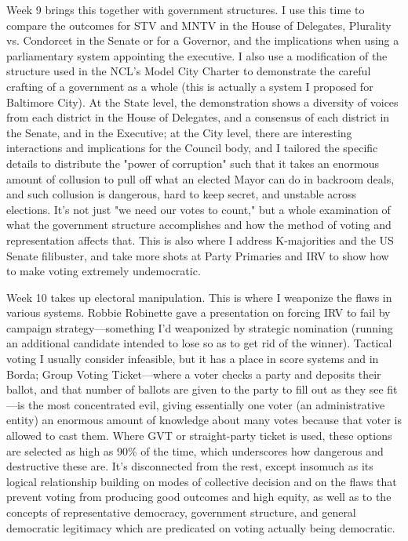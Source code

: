 Week 9 brings this together with government structures.  I use this time to compare the outcomes for STV and MNTV in the House of Delegates, Plurality vs. Condorcet in the Senate or for a Governor, and the implications when using a parliamentary system appointing the executive.  I also use a modification of the structure used in the NCL's Model City Charter to demonstrate the careful crafting of a government as a whole (this is actually a system I proposed for Baltimore City).  At the State level, the demonstration shows a diversity of voices from each district in the House of Delegates, and a consensus of each district in the Senate, and in the Executive; at the City level, there are interesting interactions and implications for the Council body, and I tailored the specific details to distribute the "power of corruption" such that it takes an enormous amount of collusion to pull off what an elected Mayor can do in backroom deals, and such collusion is dangerous, hard to keep secret, and unstable across elections.  It's not just "we need our votes to count," but a whole examination of what the government structure accomplishes and how the method of voting and representation affects that.  This is also where I address K-majorities and the US Senate filibuster, and take more shots at Party Primaries and IRV to show how to make voting extremely undemocratic.

Week 10 takes up electoral manipulation.  This is where I weaponize the flaws in various systems.  Robbie Robinette gave a presentation on forcing IRV to fail by campaign strategy—something I'd weaponized by strategic nomination (running an additional candidate intended to lose so as to get rid of the winner).  Tactical voting I usually consider infeasible, but it has a place in score systems and in Borda; Group Voting Ticket—where a voter checks a party and deposits their ballot, and that number of ballots are given to the party to fill out as they see fit—is the most concentrated evil, giving essentially one voter (an administrative entity) an enormous amount of knowledge about many votes because that voter is allowed to cast them.  Where GVT or straight-party ticket is used, these options are selected as high as 90\% of the time, which underscores how dangerous and destructive these are.  It's disconnected from the rest, except insomuch as its logical relationship building on modes of collective decision and on the flaws that prevent voting from producing good outcomes and high equity, as well as to the concepts of representative democracy, government structure, and general democratic legitimacy which are predicated on voting actually being democratic.




